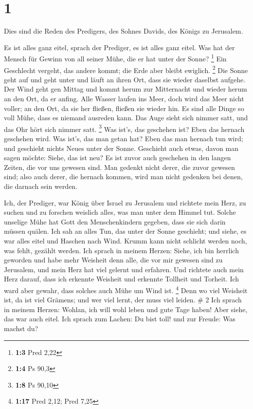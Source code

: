 \hypertarget{section}{%
\section{1}\label{section}}

 Dies sind die Reden des Predigers, des Sohnes Davids, des
Königs zu Jerusalem.

 Es ist alles ganz eitel, sprach der Prediger, es ist alles
ganz eitel.  Was hat der Mensch für Gewinn von all seiner
Mühe, die er hat unter der Sonne? \footnote{\textbf{1:3} Pred 2,22}
 Ein Geschlecht vergeht, das andere kommt; die Erde aber
bleibt ewiglich. \footnote{\textbf{1:4} Ps 90,3}  Die Sonne
geht auf und geht unter und läuft an ihren Ort, dass sie wieder daselbst
aufgehe.  Der Wind geht gen Mittag und kommt herum zur
Mitternacht und wieder herum an den Ort, da er anfing.  Alle
Wasser laufen ins Meer, doch wird das Meer nicht voller; an den Ort, da
sie her fließen, fließen sie wieder hin.  Es sind alle Dinge
so voll Mühe, dass es niemand ausreden kann. Das Auge sieht sich nimmer
satt, und das Ohr hört sich nimmer satt. \footnote{\textbf{1:8} Ps 90,10}
 Was ist's, das geschehen ist? Eben das hernach geschehen
wird. Was ist's, das man getan hat? Eben das man hernach tun wird; und
geschieht nichts Neues unter der Sonne.  Geschieht auch
etwas, davon man sagen möchte: Siehe, das ist neu? Es ist zuvor auch
geschehen in den langen Zeiten, die vor uns gewesen sind. 
Man gedenkt nicht derer, die zuvor gewesen sind; also auch derer, die
hernach kommen, wird man nicht gedenken bei denen, die darnach sein
werden.

 Ich, der Prediger, war König über Israel zu Jerusalem
 und richtete mein Herz, zu suchen und zu forschen weislich
alles, was man unter dem Himmel tut. Solche unselige Mühe hat Gott den
Menschenkindern gegeben, dass sie sich darin müssen quälen.
 Ich sah an alles Tun, das unter der Sonne geschieht; und
siehe, es war alles eitel und Haschen nach Wind.  Krumm
kann nicht schlicht werden noch, was fehlt, gezählt werden.
 Ich sprach in meinem Herzen: Siehe, ich bin herrlich
geworden und habe mehr Weisheit denn alle, die vor mir gewesen sind zu
Jerusalem, und mein Herz hat viel gelernt und erfahren. 
Und richtete auch mein Herz darauf, dass ich erkennte Weisheit und
erkennte Tollheit und Torheit. Ich ward aber gewahr, dass solches auch
Mühe um Wind ist. \footnote{\textbf{1:17} Pred 2,12; Pred 7,25}
 Denn wo viel Weisheit ist, da ist viel Grämens; und wer
viel lernt, der muss viel leiden. \# 2  Ich sprach in meinem
Herzen: Wohlan, ich will wohl leben und gute Tage haben! Aber siehe, das
war auch eitel.  Ich sprach zum Lachen: Du bist toll! und
zur Freude: Was machst du?


